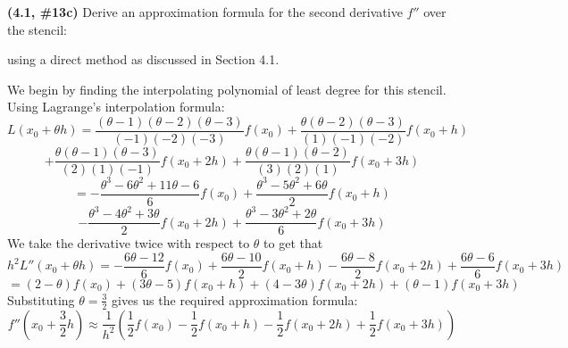 \documentclass{eh-homework}
\begin{document}
\begin{question}{3}
\textbf{(4.1, \#13c)} Derive an approximation formula for the second derivative \( f'' \) over the stencil:

\begin{center}
\end{center}

using a direct method as discussed in Section 4.1.

\bigskip

We begin by finding the interpolating polynomial of least degree for this stencil. Using Lagrange's interpolation formula:
\[
    L(x_0 + \theta h) = \frac{(\theta - 1)(\theta - 2)(\theta - 3)}{(-1)(-2)(-3)}f(x_0) + \frac{\theta(\theta - 2)(\theta - 3)}{(1)(-1)(-2)}f(x_0 + h)
\]
\[
    + \frac{\theta(\theta - 1)(\theta - 3)}{(2)(1)(-1)}f(x_0 + 2h) + \frac{\theta(\theta - 1)(\theta - 2)}{(3)(2)(1)}f(x_0 + 3h)
\]
\[
    = -\frac{\theta ^3 -6 \theta ^2 + 11 \theta - 6}{6}f(x_0) + \frac{\theta ^3 -5 \theta ^2 + 6 \theta}{2}f(x_0 + h)
\]
\[
    - \frac{\theta ^3 - 4 \theta ^2 + 3 \theta}{2}f(x_0 + 2h) + \frac{\theta ^3 - 3 \theta^2 + 2 \theta}{6}f(x_0 + 3h)
\]
We take the derivative twice with respect to \(\theta\) to get that
\[
    h^2L''(x_0 + \theta h) = -\frac{6\theta - 12}{6}f(x_0)+\frac{6 \theta - 10}{2}f(x_0 + h)-\frac{6\theta - 8}{2}f(x_0 + 2h)+\frac{6\theta - 6}{6}f(x_0 + 3h)
\]
\[
    = (2- \theta)f(x_0) +(3\theta - 5)f(x_0 + h)+(4 - 3\theta)f(x_0 + 2h)+(\theta - 1)f(x_0 + 3h)
\]
Substituting \(\theta = \frac{3}{2}\) gives us the required approximation formula:
\[
    f''\left( x_0 + \frac{3}{2}h \right) \approx \frac{1}{h^2}\left( \frac{1}{2}f(x_0) - \frac{1}{2} f(x_0 + h) - \frac{1}{2} f(x_0 + 2h) + \frac{1}{2}f(x_0 + 3h) \right) 
\]
\end{question}
\newpage
\end{document}
